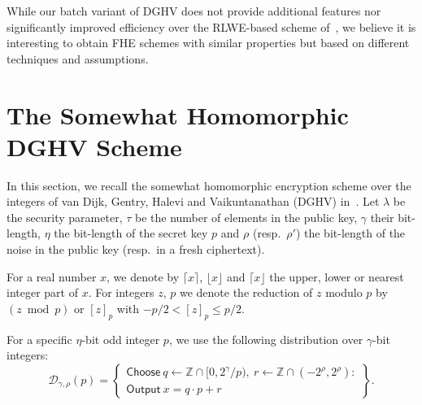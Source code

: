 \documentclass[11pt]{llncs}
\renewcommand\leq\leqslant
\newcommand*\Choose{\ensuremath{\mathsf{Choose}\ }}
\newcommand*\Output{\ensuremath{\mathsf{Output}\ }}
\begin{document}
While our batch variant of DGHV does not provide additional features nor
significantly improved efficiency over the RLWE-based scheme of~\cite{GHS2012a}, we believe it is interesting to obtain FHE schemes with
similar properties but based on different techniques and assumptions.  


\section{The Somewhat Homomorphic DGHV Scheme}
\label{sec:dghv}

In this section, we recall the somewhat homomorphic encryption scheme
over the integers of van Dijk, Gentry, Halevi and
Vaikuntanathan (DGHV) in~\cite{vDGHV2010}. Let $\lambda$ be the
security parameter, $\tau$ be the number of elements in the public
key, $\gamma$ their bit-length, $\eta$
the bit-length of the secret key $p$ and $\rho$ (resp.\ $\rho'$) the
bit-length of the noise in the public key (resp.\ in a fresh
ciphertext). 

For a real number
$x$, we denote by $\lceil x \rceil$, $\lfloor x \rfloor$ and $\lceil x
\rfloor$ the upper, lower or nearest integer part of $x$. For
integers $z$, $p$ we denote the reduction of $z$ modulo $p$ by
$(z\bmod p)$ or $[z]_p$ with $-p/2 < [z]_p \leq p/2$. 

For a specific $\eta$-bit odd integer $p$, we use the following distribution over $\gamma$-bit integers:
\[ \mathcal{D}_{\gamma,\rho}(p) = \left\{ \begin{array}{c}\Choose q \leftarrow \mathbb{Z} \cap [0,2^\gamma/p),~
r \leftarrow \mathbb{Z} \cap (-2^\rho,2^\rho) :\\ \Output x =
q \cdot p + r \end{array}\right\}. \]
\end{document}
